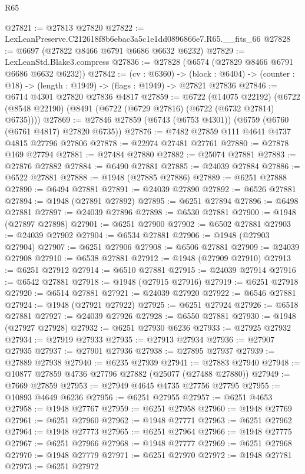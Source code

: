 \begin{lexlean}{R65}
\begin{coremodule}
{@27821 := @27813 @27820
@27822 := LexLeanPreserve.C212618f8b6ebac3a5c1e1dd0896866e7.R65.__fits_66
@27828 := @6697 (@27822 @8466 @6791 @6686 @6632 @6232)
@27829 := LexLeanStd.Blake3.compress
@27836 := @27828 (@6574 (@27829 @8466 @6791 @6686 @6632 @6232))
@27842 := (cv : @6360) ->
  (block : @6404) -> (counter : @18) -> (length : @1949) -> (flags : @1949) -> @27821 @27836
@27846 := @6714 @4301 @27820 @27836 @4817
@27859 := @6722
    (@14075 @22192)
    (@6722 (@8548 @22190) (@8491 (@6722 (@6729 @27816) (@6722 (@6732 @27814) @6735))))
@27869 := @27846 @27859 (@6743 (@6753 @4301)) (@6759 (@6760 (@6761 @4817) @27820 @6735))
@27876 := @7482 @27859 @111 @4641 @4737 @4815 @27796 @27806
@27878 := @22974 @27481 @27761
@27880 := @27878 @169 @27794
@27881 := @27484 @27880
@27882 := @25074 @27881
@27883 := @27876 @27882
@27884 := @6490 @27881
@27885 := @24039 @27884
@27886 := @6522 @27881
@27888 := @1948 (@27885 @27886)
@27889 := @6251 @27888
@27890 := @6494 @27881
@27891 := @24039 @27890
@27892 := @6526 @27881
@27894 := @1948 (@27891 @27892)
@27895 := @6251 @27894
@27896 := @6498 @27881
@27897 := @24039 @27896
@27898 := @6530 @27881
@27900 := @1948 (@27897 @27898)
@27901 := @6251 @27900
@27902 := @6502 @27881
@27903 := @24039 @27902
@27904 := @6534 @27881
@27906 := @1948 (@27903 @27904)
@27907 := @6251 @27906
@27908 := @6506 @27881
@27909 := @24039 @27908
@27910 := @6538 @27881
@27912 := @1948 (@27909 @27910)
@27913 := @6251 @27912
@27914 := @6510 @27881
@27915 := @24039 @27914
@27916 := @6542 @27881
@27918 := @1948 (@27915 @27916)
@27919 := @6251 @27918
@27920 := @6514 @27881
@27921 := @24039 @27920
@27922 := @6546 @27881
@27924 := @1948 (@27921 @27922)
@27925 := @6251 @27924
@27926 := @6518 @27881
@27927 := @24039 @27926
@27928 := @6550 @27881
@27930 := @1948 (@27927 @27928)
@27932 := @6251 @27930 @6236
@27933 := @27925 @27932
@27934 := @27919 @27933
@27935 := @27913 @27934
@27936 := @27907 @27935
@27937 := @27901 @27936
@27938 := @27895 @27937
@27939 := @27889 @27938
@27940 := @6235 @27939
@27941 := @27883 @27940
@27948 := @10877 @27859 @4736 @27796 @27882 (@25077 (@27488 @27880))
@27949 := @7669 @27859
@27953 := @27949 @4645 @4735 @27756 @27795
@27955 := @10893 @4649 @6236
@27956 := @6251 @27955
@27957 := @6251 @4653
@27958 := @1948 @27767
@27959 := @6251 @27958
@27960 := @1948 @27769
@27961 := @6251 @27960
@27962 := @1948 @27771
@27963 := @6251 @27962
@27964 := @1948 @27773
@27965 := @6251 @27964
@27966 := @1948 @27775
@27967 := @6251 @27966
@27968 := @1948 @27777
@27969 := @6251 @27968
@27970 := @1948 @27779
@27971 := @6251 @27970
@27972 := @1948 @27781
@27973 := @6251 @27972
}
\end{coremodule}
\end{lexlean}
